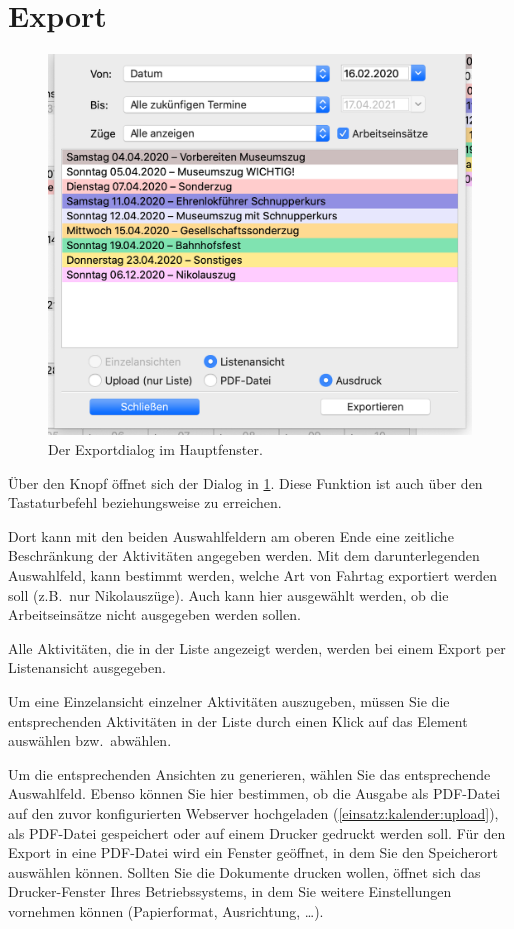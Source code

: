 \section{Export}\label{einsatz:kalender:export}
\begin{figure}[!h]
  \centering
	\includegraphics[width=.5\textwidth]{img/export}
	\caption{Der Exportdialog im Hauptfenster.}
	\label{fig:einsatz:kalender:export}
\end{figure}
Über den Knopf  öffnet sich der Dialog in \cref{fig:einsatz:kalender:export}.
Diese Funktion ist auch über den Tastaturbefehl  beziehungsweise  zu erreichen.

Dort kann mit den beiden Auswahlfeldern am oberen Ende eine zeitliche Beschränkung der Aktivitäten angegeben werden.
Mit dem darunterlegenden Auswahlfeld, kann bestimmt werden, welche Art von Fahrtag exportiert werden soll (z.B.\ nur Nikolauszüge).
Auch kann hier ausgewählt werden, ob die Arbeitseinsätze nicht ausgegeben werden sollen.

Alle Aktivitäten, die in der Liste angezeigt werden, werden bei einem Export per Listenansicht ausgegeben.

Um eine Einzelansicht einzelner Aktivitäten auszugeben, müssen Sie die entsprechenden Aktivitäten in der Liste durch einen Klick auf das Element auswählen bzw.\ abwählen.

Um die entsprechenden Ansichten zu generieren,
wählen Sie das entsprechende Auswahlfeld.
Ebenso können Sie hier bestimmen, ob die Ausgabe als PDF-Datei auf den zuvor konfigurierten Webserver hochgeladen (\cref{einsatz:kalender:upload}),
als PDF-Datei gespeichert oder auf einem Drucker gedruckt werden soll.
Für den Export in eine PDF-Datei wird ein Fenster geöffnet, in dem Sie den Speicherort auswählen können.
Sollten Sie die Dokumente drucken wollen,
öffnet sich das Drucker-Fenster Ihres Betriebssystems,
in dem Sie weitere Einstellungen vornehmen können (Papierformat, Ausrichtung, \dots).

